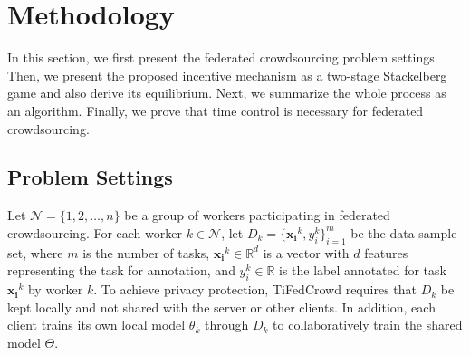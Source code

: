 \documentclass[final,1p,times]{elsarticle}
\begin{document}
\section{Methodology} \label{sec:mtd}
In this section, we first present the federated crowdsourcing problem settings. Then, we present the proposed incentive mechanism as a two-stage Stackelberg game and also derive its equilibrium. Next, we summarize the whole process as an algorithm. Finally, we prove that time control is necessary for federated crowdsourcing.

\subsection{Problem Settings}
Let $\bm{\mathcal{N}} = \{1,2,\dots,n\}$ be a group of workers participating in federated crowdsourcing. For each worker $k\in\bm{\mathcal{N}}$, let $D_k=\{\bm{x_i}^k,y_i^k\}_{i=1}^m$ be the data sample set, where $m$ is the number of tasks, $\bm{x_i}^k\in\mathbb{R}^d$ is a vector with $d$ features representing the task for annotation, and $y_i^k\in\mathbb{R}$ is the label annotated for task $\bm{x_i}^k$ by worker $k$. To achieve privacy protection, TiFedCrowd requires that $D_k$ be kept locally and not shared with the server or other clients. In addition, each client trains its own local model $\theta_k$ through $D_k$ to collaboratively train the shared model $\Theta$.
\end{document}
